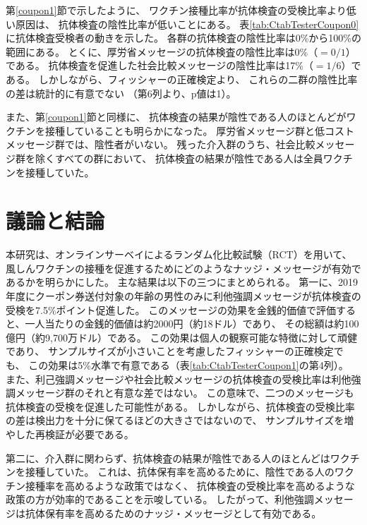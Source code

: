 \documentclass[
  11pt,
  a4paper,
]{article}
\begin{document}
第\ref{coupon1}節で示したように、
ワクチン接種比率が抗体検査の受検比率より低い原因は、
抗体検査の陰性比率が低いことにある。
表\ref{tab:CtabTesterCoupon0}に抗体検査受検者の動きを示した。
各群の抗体検査の陰性比率は0\%から100\%の範囲にある。
とくに、厚労省メッセージの抗体検査の陰性比率は0\%（\(=0/1\)）である。
抗体検査を促進した社会比較メッセージの陰性比率は17\%（\(=1/6\)）である。
しかしながら、フィッシャーの正確検定より、
これらの二群の陰性比率の差は統計的に有意でない
（第6列より、p値は1）。

また、第\ref{coupon1}節と同様に、
抗体検査の結果が陰性である人のほとんどがワクチンを接種していることも明らかになった。
厚労省メッセージ群と低コストメッセージ群では、陰性者がいない。
残った介入群のうち、社会比較メッセージ群を除くすべての群において、
抗体検査の結果が陰性である人は全員ワクチンを接種していた。

\hypertarget{conclusion}{%
\section{議論と結論}\label{conclusion}}

本研究は、オンラインサーベイによるランダム化比較試験（RCT）を用いて、
風しんワクチンの接種を促進するためにどのようなナッジ・メッセージが有効であるかを明らかにした。
主な結果は以下の三つにまとめられる。
第一に、2019年度にクーポン券送付対象の年齢の男性のみに利他強調メッセージが抗体検査の受検を7.5\%ポイント促進した。
このメッセージの効果を金銭的価値で評価すると、一人当たりの金銭的価値は約2000円（約18ドル）であり、
その総額は約100億円（約9,700万ドル）である。
この効果は個人の観察可能な特徴に対して頑健であり、
サンプルサイズが小さいことを考慮したフィッシャーの正確検定でも、
この効果は5\%水準で有意である（表\ref{tab:CtabTesterCoupon1}の第4列）。
また、利己強調メッセージや社会比較メッセージの抗体検査の受検比率は利他強調メッセージ群のそれと有意な差ではない。
この意味で、二つのメッセージも抗体検査の受検を促進した可能性がある。
しかしながら、抗体検査の受検比率の差は検出力を十分に保てるほどの大きさではないので、
サンプルサイズを増やした再検証が必要である。

第二に、介入群に関わらず、抗体検査の結果が陰性である人のほとんどはワクチンを接種していた。
これは、抗体保有率を高めるために、陰性である人のワクチン接種率を高めるような政策ではなく、
抗体検査の受検比率を高めるような政策の方が効率的であることを示唆している。
したがって、利他強調メッセージは抗体保有率を高めるためのナッジ・メッセージとして有効である。
\end{document}
